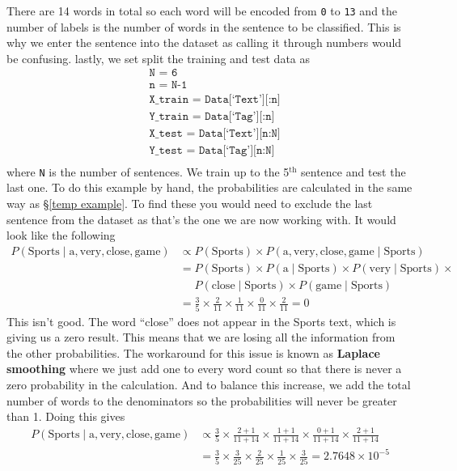 \documentclass[12pt,twoside]{report}   %
\newcommand{\bb}{\textbf}
\newcommand{\te}{\text}
\begin{document}
There are 14 words in total so each word will be encoded from \colorbox{codegrey}{\texttt{0}} to \colorbox{codegrey}{\texttt{13}} and the number of labels is the number of words in the sentence to be classified. This is why we enter the sentence into the dataset as calling it through numbers would be confusing. lastly, we set split the training and test data as
\begin{align*}
&\texttt{N = 6}\\
&\texttt{n = N-1}\\
&\texttt{X\_train = Data[`Text'][:n]}\\
&\texttt{Y\_train = Data[`Tag'][:n]}\\
&\texttt{X\_test = Data[`Text'][n:N]}\\
&\texttt{Y\_test = Data[`Tag'][n:N]}\\
\end{align*}
where \colorbox{codegrey}{\texttt{N}} is the number of sentences. We train up to the 5$^\text{th}$ sentence and test the last one. To do this example by hand, the probabilities are calculated in the same way as \S\ref{temp example}. To find these you would need to exclude the last sentence from the dataset as that's the one we are now working with. It would look like the following
\begin{align*}
P(\text{Sports}\mid \te{a}, \te{very}, \te{close}, \te{game}) &\propto P(\te{Sports})\times P(\te{a}, \te{very}, \te{close}, \te{game}\mid\te{Sports})\\
&= P(\te{Sports})\times P(\te{a}\mid\te{Sports})\times P(\te{very}\mid\te{Sports})\times\\
&\quad\,\,P(\te{close}\mid\te{Sports})\times P(\te{game}\mid\te{Sports})\\
&= \frac{3}{5} \times \frac{2}{11} \times \frac{1}{11} \times \frac{0}{11} \times \frac{2}{11} = 0
\end{align*}
This isn't good. The word ``close'' does not appear in the Sports text, which is giving us a zero result. This means that we are losing all the information from the other probabilities. The workaround for this issue is known as \bb{Laplace smoothing} where we just add one to every word count so that there is never a zero probability in the calculation. And to balance this increase, we add the total number of words to the denominators so the probabilities will never be greater than 1. Doing this gives
\begin{align*}
P(\text{Sports}\mid \te{a}, \te{very}, \te{close}, \te{game}) &\propto \frac{3}{5} \times \frac{2+1}{11+14} \times \frac{1+1}{11+14} \times \frac{0+1}{11+14} \times \frac{2+1}{11+14}\\
&= \frac{3}{5} \times \frac{3}{25} \times \frac{2}{25} \times \frac{1}{25} \times \frac{3}{25} = 2.7648\times10^{-5}
\end{align*}
\end{document}
